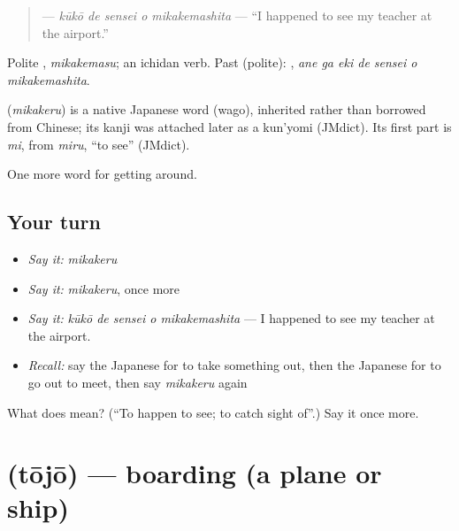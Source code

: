 \begin{quote}
\textbf{  } — \emph{kūkō de sensei o mikakemashita} — \textquotedblleft{}I happened to see my teacher at the airport.\textquotedblright{}
\end{quote}

Polite \textbf{}, \emph{mikakemasu}; an ichidan verb. Past (polite): \textbf{   }, \emph{ane ga eki de sensei o mikakemashita}.

\begin{cousinweb}
\textbf{} (\emph{mikakeru}) is a native Japanese word (wago), inherited rather than borrowed from Chinese; its kanji was attached later as a kun'yomi (JMdict). Its first part is \emph{mi}, from \emph{miru}, \textquotedblleft{}to see\textquotedblright{} (JMdict).
\end{cousinweb}

\begin{grammarlens}[title={What you've built}]
One more word for getting around.
\end{grammarlens}

\subsection*{Your turn}
\begin{itemize}
\raggedright
  \item \emph{Say it:} \emph{mikakeru}
  \item \emph{Say it:} \emph{mikakeru}, once more
  \item \emph{Say it:} \emph{kūkō de sensei o mikakemashita} — I happened to see my teacher at the airport.
  \item \emph{Recall:} say the Japanese for to take something out, then the Japanese for to go out to meet, then say \emph{mikakeru} again
\end{itemize}

\begin{tcolorbox}[breakable,colback=teal!4,colframe=teal!35!black,title={Before you move on}]
What does  mean? (\textquotedblleft{}To happen to see; to catch sight of\textquotedblright{}.) Say it once more.
\end{tcolorbox}
\section[\texorpdfstring{\ja{とうじょう} (tōjō)}{とうじょう (tōjō)}]{ (tōjō) — boarding (a plane or ship)}

